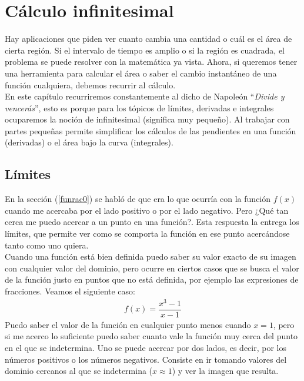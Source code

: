 \chapter{Cálculo infinitesimal}
\label{C1V}

Hay aplicaciones que piden ver cuanto cambia una cantidad o cuál es el área de cierta región. Si el intervalo de tiempo es amplio o si la región es cuadrada, el problema se puede resolver con la matemática ya vista. Ahora, si queremos tener una herramienta para calcular el área o saber el cambio instantáneo de una función cualquiera, debemos recurrir al cálculo. \\

En este capítulo recurriremos constantemente al dicho de Napoleón ``\textit{Divide y vencerás}'', esto es porque para los tópicos de límites, derivadas e integrales ocuparemos la noción de infinitesimal (significa muy pequeño). Al trabajar con partes pequeñas permite simplificar los cálculos de las pendientes en una función (derivadas) o el área bajo la curva (integrales).  

\section{Límites}
\label{C1V0}

En la sección (\ref{funrac0}) se habló de que era lo que ocurría con la función $f(x)$ cuando me acercaba por el lado positivo o por el lado negativo. Pero ¿Qué tan cerca me puedo acercar a un punto en una función?. Esta respuesta la entrega los límites, que permite ver como se comporta la función en ese punto acercándose tanto como uno quiera.\\

Cuando una función está bien definida puedo saber su valor exacto de su imagen con cualquier valor del dominio, pero ocurre en ciertos casos que se busca el valor de la función justo en puntos que no está definida, por ejemplo las expresiones de fracciones. Veamos el siguiente caso:
\begin{eqnarray}
f(x)=\dfrac{x^{3}-1}{x-1}
\end{eqnarray} 
Puedo saber el valor de la función en cualquier punto menos cuando $x=1$, pero si me acerco lo suficiente puedo saber cuanto vale la función muy cerca del punto en el que se indetermina. Uno se puede acercar por dos lados, es decir, por los números positivos o los números negativos. Consiste en ir tomando valores del dominio cercanos al que se indetermina ($x\approx 1$) y ver la imagen que resulta.

